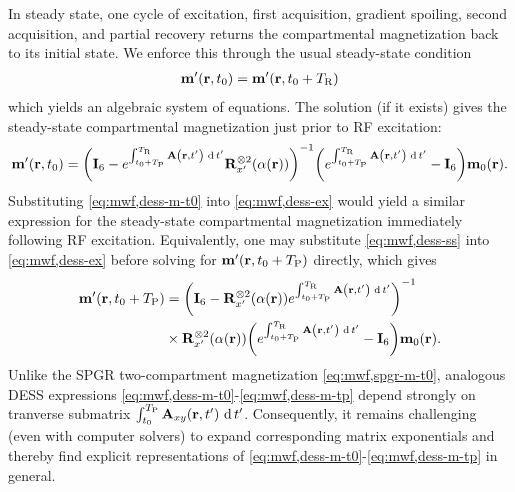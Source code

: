 In steady state,
one cycle of excitation,
first acquisition,
gradient spoiling,
second acquisition,
and partial recovery
returns the compartmental magnetization
back to its initial state.
We enforce this through 
the usual steady-state condition
\begin{align}
	\bmmp\prtz = \bmmp\paren{\bmr,t_0+\TR}
	\label{eq:mwf,dess-ss}
\end{align}
which yields an algebraic system of equations.
The solution
(if it exists)
gives the steady-state compartmental magnetization
just prior to RF excitation:
\begin{align}
	\bmmp\prtz = 
		\inv{\eye{6} - e^{\int_{t_0+\TP}^{\TR} \bmA\paren{\bmr,t'} \der{t'}} \bmRxpsix{\flip\pr}}
		\paren{e^{\int_{t_0+\TP}^{\TR} \bmA\paren{\bmr,t'} \der{t'}} - \eye{6}} \bmmzero\pr.
	\label{eq:mwf,dess-m-t0}
\end{align}
Substituting \eqref{eq:mwf,dess-m-t0} into \eqref{eq:mwf,dess-ex}
would yield a similar expression
for the steady-state compartmental magnetization
immediately following RF excitation.
Equivalently,
one may substitute \eqref{eq:mwf,dess-ss} into \eqref{eq:mwf,dess-ex}
before solving for $\bmmp\paren{\bmr,t_0+\TP}$ directly,
which gives
\begin{align}
	\bmmp\paren{\bmr,t_0+\TP} &=
		\inv{\eye{6} - \bmRxpsix{\flip\pr} e^{\int_{t_0+\TP}^{\TR} \bmA\paren{\bmr,t'} \der{t'}}}
		\nonumber \\
	&\times \bmRxpsix{\flip\pr} 
		\paren{e^{\int_{t_0+\TP}^{\TR} \bmA\paren{\bmr,t'} \der{t'}} - \eye{6}} \bmmzero\pr.
		\label{eq:mwf,dess-m-tp}
\end{align}
Unlike the SPGR two-compartment magnetization 
\eqref{eq:mwf,spgr-m-t0},
analogous DESS expressions 
\eqref{eq:mwf,dess-m-t0}-\eqref{eq:mwf,dess-m-tp} depend strongly
on tranverse submatrix $\int_{t_0}^{\TP} \bmAxy\paren{\bmr,t'} \der{t'}$.
Consequently,
it remains challenging (even with computer solvers)
to expand corresponding matrix exponentials
and thereby find explicit representations 
of \eqref{eq:mwf,dess-m-t0}-\eqref{eq:mwf,dess-m-tp}
in general.

